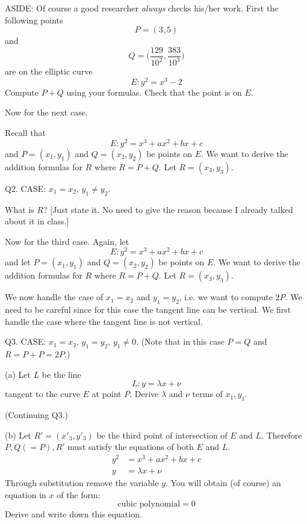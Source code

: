 \documentclass[a4paper,12pt]{article}
\begin{document}
\newpage

ASIDE: 
Of course a good researcher {\it always} checks his/her work.
First the following points
\[
P = (3, 5)
\]
and 
\[
Q = \biggl( \frac{129}{10^2}, \frac{383}{10^3} \biggr)
\]
are on the elliptic curve
\[
E: y^2 = x^3 - 2
\]
Compute $P + Q$ using your formulas.
Check that the point is on $E$.
  
\newpage

Now for the next case.

Recall that  
\[
E: y^2 = x^3 + ax^2 + bx + c
\]
and
$P = (x_1, y_1)$ and $Q = (x_2, y_2)$ be points on $E$.
We want to derive the addition formulas for $R$ where $R = P + Q$.
Let $R = (x_3, y_3)$.

Q2. CASE: $x_1 = x_2$, $y_1 \neq y_2$.

What is $R$? [Just state it. No need to give the reason
because I already talked about it in class.]

\SOLUTION



\newpage

Now for the third case.
Again, let 
\[
E: y^2 = x^3 + ax^2 + bx + c
\]
and
let $P = (x_1, y_1)$ and $Q = (x_2, y_2)$ be points on $E$.
We want to derive the addition formulas for $R$ where $R = P + Q$.
Let $R = (x_3, y_3)$.

We now handle the case of $x_1 = x_2$ and $y_1 = y_2$, i.e. we 
want to compute $2P$.
We need to be careful since for this case the tangent line can be
vertical.
We first handle the case where the tangent line is not vertical.

Q3. CASE: $x_1 = x_2$, $y_1 = y_2$, $y_1 \neq 0$.
(Note that in this case $P = Q$ and $R = P + P = 2P$.)

(a) Let $L$ be the line
\[
L: y = \lambda x + \nu 
\] 
tangent to the curve $E$ at point $P$.
Derive $\lambda$ and $\nu$
terms of $x_1, y_1$.

\SOLUTION




\newpage

(Continuing Q3.)


(b) Let $R' = (x'_3, y'_3)$ be the third point of intersection of $E$ and $L$.
Therefore $P, Q (= P), R'$ must satisfy the equations of both $E$ and $L$.
\begin{align*}
y^2 &= x^3 + ax^2 + bx + c \\
y &= \lambda x + \nu
\end{align*}
Through substitution remove the variable $y$. 
You will obtain (of course) an equation in $x$ of the form:
\[
\text{cubic polynomial} = 0
\]
Derive and write down this equation.
\end{document}
